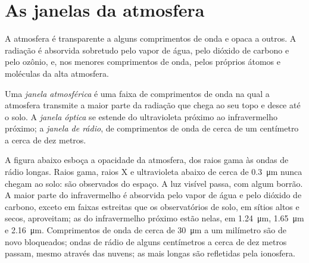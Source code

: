 \section{As janelas da atmosfera}

A atmosfera é transparente a alguns comprimentos de onda e opaca a outros. A radiação é absorvida sobretudo pelo vapor de água, pelo dióxido de carbono e pelo ozônio, e, nos menores comprimentos de onda, pelos próprios átomos e moléculas da alta atmosfera.

\begin{definition}\label{def:b1:observing-the-sky:window}
Uma \emph{janela atmosférica} é uma faixa de comprimentos de onda na qual a atmosfera transmite a maior parte da radiação que chega ao seu topo e desce até o solo. A \emph{janela óptica} se estende do ultravioleta próximo ao infravermelho próximo; a \emph{janela de rádio}, de comprimentos de onda de cerca de um centímetro a cerca de dez metros.
\end{definition}

A figura abaixo esboça a opacidade da atmosfera, dos raios gama às ondas de rádio longas. Raios gama, raios X e ultravioleta abaixo de cerca de \qty{0.3}{\micro\metre} nunca chegam ao solo: são observados do espaço. A luz visível passa, com algum borrão. A maior parte do infravermelho é absorvida pelo vapor de água e pelo dióxido de carbono, exceto em faixas estreitas que os observatórios de solo, em sítios altos e secos, aproveitam; as  do infravermelho próximo estão nelas, em \qty{1.24}{\micro\metre}, \qty{1.65}{\micro\metre} e \qty{2.16}{\micro\metre}. Comprimentos de onda de cerca de \qty{30}{\micro\metre} a um milímetro são de novo bloqueados; ondas de rádio de alguns centímetros a cerca de dez metros passam, mesmo através das nuvens; as mais longas são refletidas pela ionosfera.

